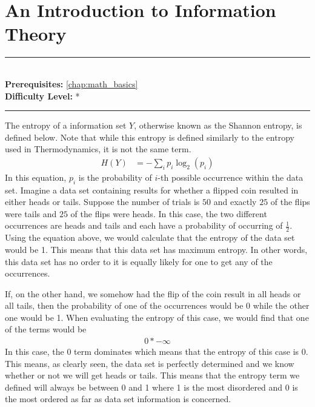 \documentclass[book.tex]{subfiles}
\begin{document}
\chapter{An Introduction to Information Theory}
\label{chap:calculus}
\noindent\rule{11cm}{0.4pt} \\
\textbf{Prerequisites:} \autoref{chap:math_basics} \\
\textbf{Difficulty Level:} * \\
\noindent\rule{11cm}{0.4pt}
\vspace{5mm}

The entropy of a information set $Y$, otherwise known as the Shannon entropy, is defined below. Note that while this entropy is defined similarly to the entropy used in Thermodynamics, it is not the same term. 
\begin{align}
H(Y) &= -\sum_{i} p_i \log_2 (p_i)
\end{align}
In this equation, $p_i$ is the probability of $i$-th possible occurrence within the data set. Imagine a data set containing results for whether a flipped coin resulted in either heads or tails. Suppose the number of trials is $50$ and exactly $25$ of the flips were tails and $25$ of the flips were heads. In this case, the two different occurrences are heads and tails and each have a probability of occurring of $\frac{1}{2}$. Using the equation above, we would calculate that the entropy of the data set would be 1. This means that this data set has maximum entropy. In other words, this data set has no order to it is equally likely for one to get any of the occurrences.

If, on the other hand, we somehow had the flip of the coin result in all heads or all tails, then the probability of one of the occurrences would be 0 while the other one would be 1. When evaluating the entropy of this case, we would find that one of the terms would be 
\begin{align}
0 * -\infty
\end{align} 
In this case, the $0$ term dominates which means that the entropy of this case is $0$. This means, as clearly seen, the data set is perfectly determined and we know whether or not we will get heads or tails. This means that the entropy term we defined will always be between 0 and 1 where 1 is the most disordered and 0 is the most ordered as far as data set information is concerned. 
\end{document}
